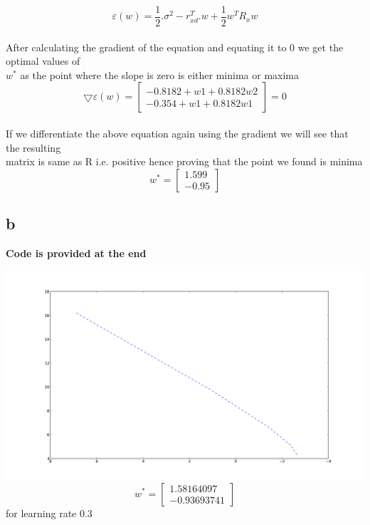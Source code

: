 \documentclass[paper=a4, fontsize=11pt]{scrartcl} %
\begin{document}
\[\varepsilon(w) = \frac{1}{2}.\sigma^{2} - r^{T}_{xd}.w + \frac{1}{2}w^{T}R_{x}w\] \\
After calculating the gradient of the equation and equating it to 0 we get the optimal values of \\
$w^{*}$ as the point where the slope is zero is either minima or maxima
 \[\bigtriangledown \varepsilon (w) = \begin{bmatrix} -0.8182 + w1 + 0.8182w2\\ -0.354 + w1 + 0.8182w1 \end{bmatrix} = 0 \]\\
If we differentiate the above equation again using the gradient we will see that the resulting \\ matrix is same as R i.e. positive hence proving that the point we found is minima 
\[ w^{*} = \begin{bmatrix} 1.599\\ -0.95 \end{bmatrix}\]


\subsection{b}
\textbf{Code is provided at the end}


\includegraphics[scale=0.4]{LearningRate_3.png}
\[ w^{*} = \begin{bmatrix} 1.58164097\\ -0.93693741 \end{bmatrix}\]
for learning rate 0.3 \\
\end{document}
